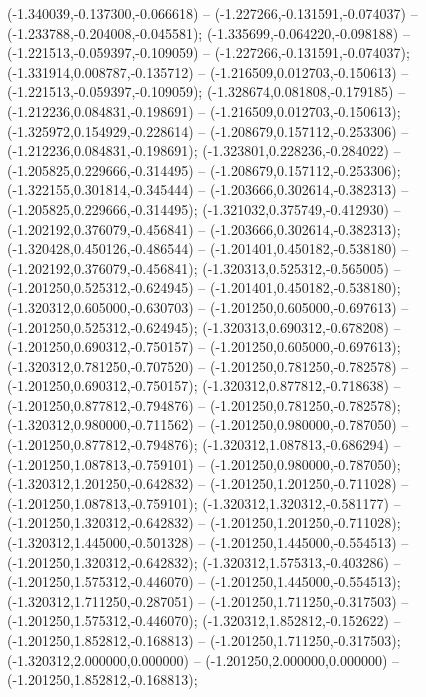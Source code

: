  (-1.340039,-0.137300,-0.066618) -- (-1.227266,-0.131591,-0.074037) -- (-1.233788,-0.204008,-0.045581);
 (-1.335699,-0.064220,-0.098188) -- (-1.221513,-0.059397,-0.109059) -- (-1.227266,-0.131591,-0.074037);
 (-1.331914,0.008787,-0.135712) -- (-1.216509,0.012703,-0.150613) -- (-1.221513,-0.059397,-0.109059);
 (-1.328674,0.081808,-0.179185) -- (-1.212236,0.084831,-0.198691) -- (-1.216509,0.012703,-0.150613);
 (-1.325972,0.154929,-0.228614) -- (-1.208679,0.157112,-0.253306) -- (-1.212236,0.084831,-0.198691);
 (-1.323801,0.228236,-0.284022) -- (-1.205825,0.229666,-0.314495) -- (-1.208679,0.157112,-0.253306);
 (-1.322155,0.301814,-0.345444) -- (-1.203666,0.302614,-0.382313) -- (-1.205825,0.229666,-0.314495);
 (-1.321032,0.375749,-0.412930) -- (-1.202192,0.376079,-0.456841) -- (-1.203666,0.302614,-0.382313);
 (-1.320428,0.450126,-0.486544) -- (-1.201401,0.450182,-0.538180) -- (-1.202192,0.376079,-0.456841);
 (-1.320313,0.525312,-0.565005) -- (-1.201250,0.525312,-0.624945) -- (-1.201401,0.450182,-0.538180);
 (-1.320312,0.605000,-0.630703) -- (-1.201250,0.605000,-0.697613) -- (-1.201250,0.525312,-0.624945);
 (-1.320313,0.690312,-0.678208) -- (-1.201250,0.690312,-0.750157) -- (-1.201250,0.605000,-0.697613);
 (-1.320312,0.781250,-0.707520) -- (-1.201250,0.781250,-0.782578) -- (-1.201250,0.690312,-0.750157);
 (-1.320312,0.877812,-0.718638) -- (-1.201250,0.877812,-0.794876) -- (-1.201250,0.781250,-0.782578);
 (-1.320312,0.980000,-0.711562) -- (-1.201250,0.980000,-0.787050) -- (-1.201250,0.877812,-0.794876);
 (-1.320312,1.087813,-0.686294) -- (-1.201250,1.087813,-0.759101) -- (-1.201250,0.980000,-0.787050);
 (-1.320312,1.201250,-0.642832) -- (-1.201250,1.201250,-0.711028) -- (-1.201250,1.087813,-0.759101);
 (-1.320312,1.320312,-0.581177) -- (-1.201250,1.320312,-0.642832) -- (-1.201250,1.201250,-0.711028);
 (-1.320312,1.445000,-0.501328) -- (-1.201250,1.445000,-0.554513) -- (-1.201250,1.320312,-0.642832);
 (-1.320312,1.575313,-0.403286) -- (-1.201250,1.575312,-0.446070) -- (-1.201250,1.445000,-0.554513);
 (-1.320312,1.711250,-0.287051) -- (-1.201250,1.711250,-0.317503) -- (-1.201250,1.575312,-0.446070);
 (-1.320312,1.852812,-0.152622) -- (-1.201250,1.852812,-0.168813) -- (-1.201250,1.711250,-0.317503);
 (-1.320312,2.000000,0.000000) -- (-1.201250,2.000000,0.000000) -- (-1.201250,1.852812,-0.168813);
